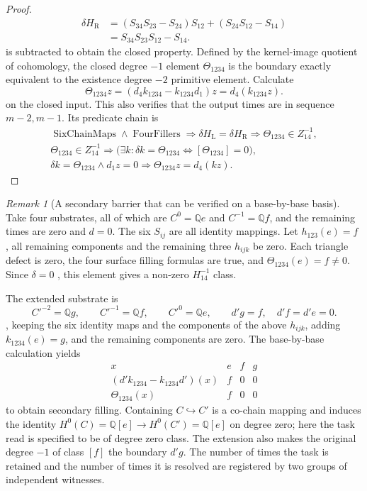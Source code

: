 \documentclass[12pt,a4paper,openany,notitlepage]{report}
\theoremstyle{plain}
\theoremstyle{definition}
\theoremstyle{remark}
\newtheorem{remark}[theorem]{Remark}
\begin{document}
\begin{CJK*}
\begin{proof}
\[\begin{aligned}
 \delta H_{\mathrm R}
 &=(S_{34}S_{23}-S_{24})S_{12}
   +(S_{24}S_{12}-S_{14})\\
 &=S_{34}S_{23}S_{12}-S_{14}.
 \end{aligned}
\] is subtracted to obtain the closed property. Defined by the kernel-image quotient of cohomology, the closed degree $-1$ element $\Theta_{1234}$ is the boundary exactly equivalent to the existence degree $-2$ primitive element. Calculate \[
 \Theta_{1234}z
 =(d_4k_{1234}-k_{1234}d_1)z
 =d_4(k_{1234}z).
\] on the closed input. This also verifies that the output times are in sequence $m-2,m-1$. Its predicate chain is \[
 \begin{gathered}
 \operatorname{SixChainMaps}\land\operatorname{FourFillers}
 \Rightarrow\delta H_{\mathrm L}=\delta H_{\mathrm R}
 \Rightarrow\Theta_{1234}\in Z^{-1}_{14},\\
 \Theta_{1234}\in Z^{-1}_{14}
 \Rightarrow
 \bigl(\exists k:\delta k=\Theta_{1234}
       \Longleftrightarrow[\Theta_{1234}]=0\bigr),\\
 \delta k=\Theta_{1234}\land d_1z=0
 \Rightarrow\Theta_{1234}z=d_4(kz).
 \end{gathered}
\]\end{proof}


\begin{remark}
[A secondary barrier that can be verified on a base-by-base basis]\label{exp:hom:secondary-example}
Take four substrates, all of which are $C^0=\mathbb Q e$ and $C^{-1}=\mathbb Q f$, and the remaining times are zero and $d=0$. The six $S_{ij}$ are all identity mappings. Let $h_{123}(e)=f$ , all remaining components and the remaining three $h_{ijk}$ be zero. Each triangle defect is zero, the four surface filling formulas are true, and $\Theta_{1234}(e)=f\ne0$. Since $\delta=0$ , this element gives a non-zero $H^{-1}_{14}$ class.

The extended substrate is \[
 C'^{-2}=\mathbb Q g,\qquad
 C'^{-1}=\mathbb Q f,\qquad C'^0=\mathbb Q e,
 \qquad d'g=f,\quad d'f=d'e=0.
\], keeping the six identity maps and the components of the above $h_{ijk}$, adding $k_{1234}(e)=g$, and the remaining components are zero. The base-by-base calculation yields \[
 \begin{array}{c|ccc}
 x&e&f&g\\ \hline
 (d'k_{1234}-k_{1234}d')(x)&f&0&0\\
 \Theta_{1234}(x)&f&0&0
 \end{array}
\] to obtain secondary filling. Containing $C\hookrightarrow C'$ is a co-chain mapping and induces the identity $H^0(C)=\mathbb Q[e]\to H^0(C')=\mathbb Q[e]$ on degree zero; here the task read is specified to be of degree zero class. The extension also makes the original degree $-1$ of class $[f]$ the boundary $d'g$. The number of times the task is retained and the number of times it is resolved are registered by two groups of independent witnesses.\end{remark}



\end{CJK*}
\end{document}
